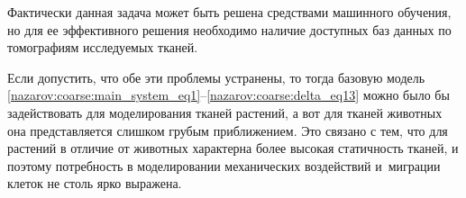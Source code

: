 Фактически данная задача может быть решена средствами машинного обучения, но для ее эффективного решения необходимо наличие доступных баз данных по томографиям исследуемых тканей. 

 Если допустить, что обе эти проблемы устранены, то тогда базовую модель \eqref{nazarov:coarse:main_system_eq1}--\eqref{nazarov:coarse:delta_eq13} можно было бы задействовать для моделирования тканей растений, а вот для тканей животных она представляется слишком грубым приближением. Это связано с тем, что для растений в отличие от животных характерна более высокая статичность тканей, и поэтому потребность в моделировании механических воздействий и~миграции клеток не столь ярко выражена. 

 


 










 

 

